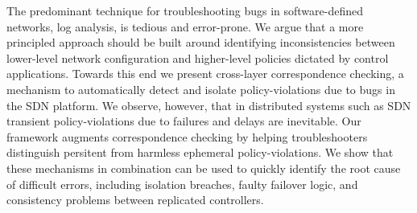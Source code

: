 The predominant technique for troubleshooting bugs in software-defined networks,
log analysis, is tedious and error-prone. We argue that a more principled
approach should be built around identifying inconsistencies between lower-level
network configuration and higher-level policies dictated by control
applications. Towards this end we present
cross-layer correspondence checking, a mechanism to automatically detect and
isolate policy-violations due to bugs in the SDN platform. We observe,
however, that in
distributed systems such as SDN 
transient policy-violations due to failures and delays are inevitable.
Our \simulator{} framework augments correspondence checking by helping troubleshooters
distinguish persitent from harmless ephemeral policy-violations.
We show that these mechanisms in combination can be used to quickly
identify the root cause of difficult errors, including isolation breaches,
faulty failover logic, and consistency problems between replicated
controllers.

